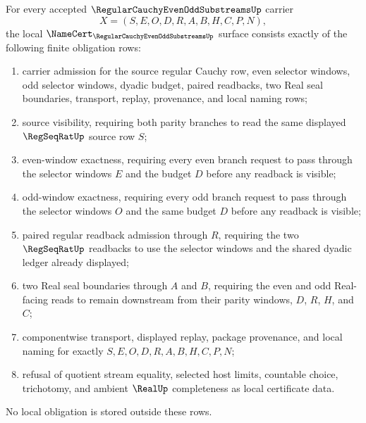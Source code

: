 \begin{theorem}
\label{thm:regular-cauchy-even-odd-substreams-namecert-obligations}
For every accepted $\RegularCauchyEvenOddSubstreamsUp$ carrier
$$
X=(S,E,O,D,R,A,B,H,C,P,N),
$$
the local $\NameCert_{\RegularCauchyEvenOddSubstreamsUp}$ surface consists exactly of the following finite obligation rows:
\begin{enumerate}
\item carrier admission for the source regular Cauchy row, even selector windows, odd selector windows, dyadic budget, paired readbacks, two Real seal boundaries, transport, replay, provenance, and local naming rows;
\item source visibility, requiring both parity branches to read the same displayed $\RegSeqRatUp$ source row $S$;
\item even-window exactness, requiring every even branch request to pass through the selector windows $E$ and the budget $D$ before any readback is visible;
\item odd-window exactness, requiring every odd branch request to pass through the selector windows $O$ and the same budget $D$ before any readback is visible;
\item paired regular readback admission through $R$, requiring the two $\RegSeqRatUp$ readbacks to use the selector windows and the shared dyadic ledger already displayed;
\item two Real seal boundaries through $A$ and $B$, requiring the even and odd Real-facing reads to remain downstream from their parity windows, $D$, $R$, $H$, and $C$;
\item componentwise transport, displayed replay, package provenance, and local naming for exactly $S,E,O,D,R,A,B,H,C,P,N$;
\item refusal of quotient stream equality, selected host limits, countable choice, trichotomy, and ambient $\RealUp$ completeness as local certificate data.
\end{enumerate}
No local obligation is stored outside these rows.
\end{theorem}
